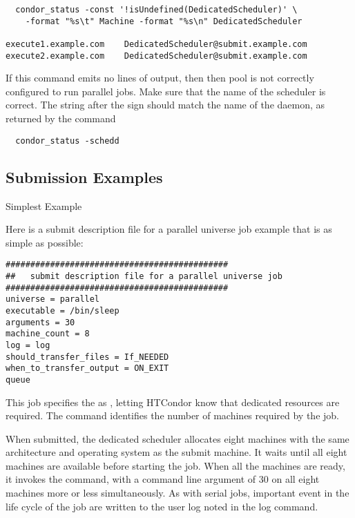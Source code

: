 \footnotesize
\begin{verbatim}
  condor_status -const '!isUndefined(DedicatedScheduler)' \
	-format "%s\t" Machine -format "%s\n" DedicatedScheduler

execute1.example.com	DedicatedScheduler@submit.example.com
execute2.example.com	DedicatedScheduler@submit.example.com

\end{verbatim}
\normalsize

If this command emits no lines of output, then then pool is
not correctly configured to run parallel jobs.
Make sure that the name of the scheduler is correct. 
The string after the  sign should match the name of the 
\Condor{schedd} daemon, as returned by the command

\begin{verbatim}
  condor_status -schedd
\end{verbatim}

\subsection{\label{sec:parallel-submit}Submission Examples}

\begin{description}
\item[Simplest Example]
\end{description}

Here is a submit description file for a parallel universe
job example that is as simple as possible:

\begin{verbatim}
#############################################
##   submit description file for a parallel universe job
#############################################
universe = parallel
executable = /bin/sleep
arguments = 30
machine_count = 8
log = log
should_transfer_files = If_NEEDED
when_to_transfer_output = ON_EXIT
queue 
\end{verbatim}

This job specifies the  as , letting
HTCondor know that dedicated resources are required.  The
 command identifies the number of machines
required by the job. 

When submitted, the dedicated scheduler allocates eight
machines with the same architecture and operating system as the submit
machine.  It waits until all eight machines are available before
starting the job.  When all the machines are ready, it invokes the
\Prog{/bin/sleep} command, with a command line argument of 30
on all eight machines more or less simultaneously.  As with serial
jobs, important event in the life cycle of the job are written
to the user log noted in the log command.

